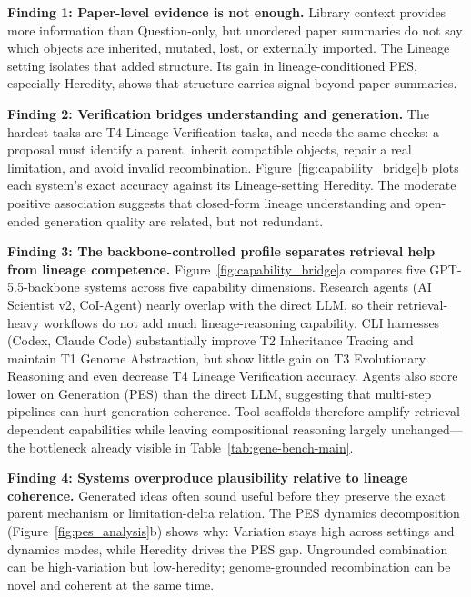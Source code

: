 \textbf{Finding 1: Paper-level evidence is not enough.}
Library context provides more information than Question-only, but unordered paper summaries do not say which \genome{} objects are inherited, mutated, lost, or externally imported. The Lineage setting isolates that added structure. Its gain in lineage-conditioned PES, especially Heredity, shows that \genomediff{} structure carries signal beyond paper summaries.

\textbf{Finding 2: Verification bridges understanding and generation.}
The hardest \geneexam{} tasks are T4 Lineage Verification tasks, and \genearena{} needs the same checks: a proposal must identify a parent, inherit compatible \genome{} objects, repair a real limitation, and avoid invalid recombination. Figure~\ref{fig:capability_bridge}b plots each system's \geneexam{} exact accuracy against its Lineage-setting \genearena{} Heredity. The moderate positive association suggests that closed-form lineage understanding and open-ended generation quality are related, but not redundant.

\textbf{Finding 3: The backbone-controlled profile separates retrieval help from lineage competence.} Figure~\ref{fig:capability_bridge}a compares five GPT-5.5-backbone systems across five capability dimensions. Research agents (AI Scientist v2, CoI-Agent) nearly overlap with the direct LLM, so their retrieval-heavy workflows do not add much lineage-reasoning capability. CLI harnesses (Codex, Claude Code) substantially improve T2 Inheritance Tracing and maintain T1 Genome Abstraction, but show little gain on T3 Evolutionary Reasoning and even decrease T4 Lineage Verification accuracy. Agents also score lower on Generation (PES) than the direct LLM, suggesting that multi-step pipelines can hurt generation coherence. Tool scaffolds therefore amplify retrieval-dependent capabilities while leaving compositional reasoning largely unchanged---the bottleneck already visible in Table~\ref{tab:gene-bench-main}.

\textbf{Finding 4: Systems overproduce plausibility relative to lineage coherence.}
Generated ideas often sound useful before they preserve the exact parent mechanism or limitation-delta relation. The PES dynamics decomposition (Figure~\ref{fig:pes_analysis}b) shows why: Variation stays high across settings and dynamics modes, while Heredity drives the PES gap. Ungrounded combination can be high-variation but low-heredity; genome-grounded recombination can be novel and coherent at the same time.

\FloatBarrier
